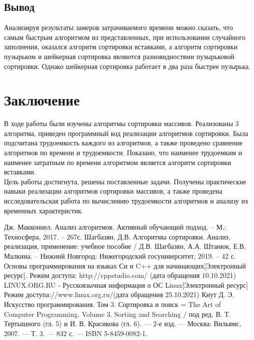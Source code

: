 \documentclass[12pt,a4paper]{report}
\begin{document}
\section*{Вывод}

Анализируя результаты замеров затрачиваемого времени можно сказать, что самым быстрым алгоритмом из представленных, при использовании 
случайного заполнения, оказался алгоритм сортировки вставками, а алгоритм сортировки пузырьком и шейкерная сортировка 
являются разновидностями пузырьковой сортировки.
Однако шейкерная сортировка работает в два раза быстрее пузырька.

\newpage
\chapter*{Заключение}

В ходе работы были изучены алгоритмы сортировки массивов. 
Реализованы 3 алгоритма, приведен программный код реализации алгоритмов сортировки.
Была подсчитана трудоемкость каждого из алгоритмов, а также проведено сравнение алгоритмов по времени
 и трудоемкости. Показано, что наименее трудоемким и наименее затратным по времени алгоритмом является 
алгоритм сортировки вставками.\\

Цель работы достигнута, решены поставленные задачи.
Получены практические навыки реализации алгоритмов сортировки массивов, а также проведена 
исследовательская работа по вычислению трудоемкости алгоритмов и анализу их временных характеристик.


\newpage
\renewcommand\bibname{Список литературы}
\makeatletter %
\def\@biblabel#1{#1. }
\makeatother
\begin{thebibliography}{2}
     Дж. Макконнел. Анализ алгоритмов. Активный обучающий подход. -- М.: Техносфера, 2017. -- 267с.
    \bibitem{}Шагбазян, Д.В.     Алгоритмы  сортировки.  Анализ,  реализация,  применение: учебное  пособие  /  Д.В. Шагбазян,  А.А.  Штанюк,  Е.В.  Малкина. – Нижний Новгород: Нижегородский госуниверситет, 2019. – 42 с. 
    \bibitem{} Основы программирования на языках Си и C++ для начинающих[Электронный ресурс]. Режим доступа: http://cppstudio.com/ (дата обращения 10.10.2021)
    LINUX.ORG.RU - Русскоязычная информация о ОС Linux[Электронный ресурс] Режим доступа://www.linux.org.ru/(дата обращения 25.10.2021)
    Кнут Д. Э. Искусство программирования. Том 3. Сортировка и поиск = The Art of Computer Programming. Volume 3. Sorting and Searching / под ред. В. Т. Тертышного (гл. 5) и И. В. Красикова (гл. 6). — 2-е изд. — Москва: Вильямс, 2007. — Т. 3. — 832 с. — ISBN 5-8459-0082-1.
\end{thebibliography}
\end{document}

